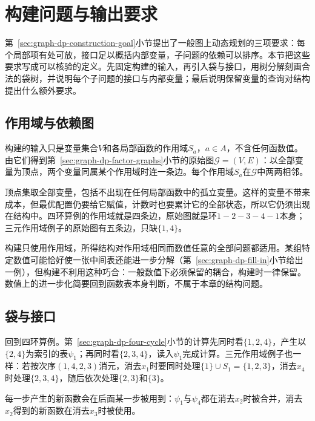 
\section{构建问题与输出要求}
\label{sec:graph-dp-construction-problem}

第~\ref{sec:graph-dp-construction-goal}小节提出了一般图上动态规划的三项要求：每个局部项有处可放，接口足以概括内部变量，子问题的依赖可以排序。本节把这些要求写成可以核验的定义。先固定构建的输入，再引入袋与接口，用树分解刻画合法的袋树，并说明每个子问题的接口与内部变量；最后说明保留变量的查询对结构提出什么额外要求。

\subsection{作用域与依赖图}
\label{sec:graph-dp-scope-graph}

构建的输入只是变量集合$V$和各局部函数的作用域$S_a$，$a\in A$，不含任何函数值。由它们得到第~\ref{sec:graph-dp-factor-graphs}小节的原始图$\mathcal G=(V,E)$：以全部变量为顶点，两个变量同属某个作用域时连一条边。每个作用域$S_a$在$\mathcal G$中两两相邻。

顶点集取全部变量，包括不出现在任何局部函数中的孤立变量。这样的变量不带来成本，但最优配置仍要给它赋值，计数时也要累计它的全部状态，所以它仍须出现在结构中。四环算例的作用域就是四条边，原始图就是环$1-2-3-4-1$本身；三元作用域例子的原始图有五条边，只缺$\{1,4\}$。

构建只使用作用域，所得结构对作用域相同而数值任意的全部问题都适用。某组特定数值可能恰好使一张中间表还能进一步分解（第~\ref{sec:graph-dp-fill-in}小节给出一例），但构建不利用这种巧合：一般数值下必须保留的耦合，构建时一律保留。数值上的进一步化简要回到函数表本身判断，不属于本章的结构问题。

\subsection{袋与接口}
\label{sec:graph-dp-bags}

回到四环算例。第~\ref{sec:graph-dp-four-cycle}小节的计算先同时看$\{1,2,4\}$，产生以$\{2,4\}$为索引的表$\psi_1$；再同时看$\{2,3,4\}$，读入$\psi_1$完成计算。三元作用域例子也一样：若按次序$(1,4,2,3)$消元，消去$x_1$时要同时处理$\{1\}\cup S_1=\{1,2,3\}$，消去$x_4$时处理$\{2,3,4\}$，随后依次处理$\{2,3\}$和$\{3\}$。

每一步产生的新函数会在后面某一步被用到：$\psi_1$与$\psi_4$都在消去$x_2$时被合并，消去$x_2$得到的新函数在消去$x_3$时被使用。

